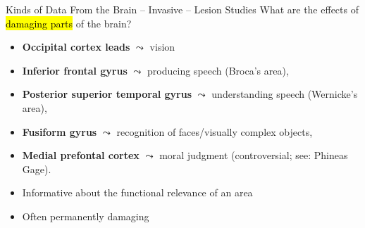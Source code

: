 \documentclass[handout,aspectratio=169]{beamer}
\begin{document}
\begin{frame}{Kinds of Data From the Brain -- Invasive -- Lesion Studies}
	What are the effects of \hl{damaging parts} of the brain?\\[0.25cm]
	\begin{itemize}
		\setlength\itemsep{0.25cm}
		\item \textbf{Occipital cortex leads} $\leadsto$ vision
		\item \textbf{Inferior frontal gyrus} $\leadsto$ producing speech (Broca's area),
		\item \textbf{Posterior superior temporal gyrus} $\leadsto$ understanding speech (Wernicke's area),
		\item \textbf{Fusiform gyrus} $\leadsto$ recognition of faces/visually complex objects,
		\item \textbf{Medial prefontal cortex} $\leadsto$ moral judgment (controversial; see: Phineas Gage).
	\end{itemize}
	\vspace{0.25cm}
	\begin{itemize}
		\setlength\itemsep{0.25cm}
		\item[\OPlus] Informative about the functional relevance of an area
		\item[\OMinus] Often permanently damaging
	\end{itemize}
\end{frame}
\end{document}
